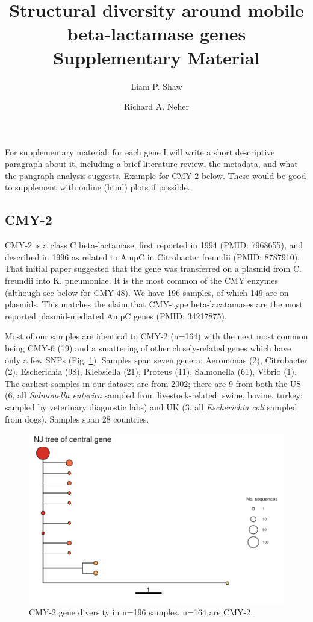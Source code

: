 \documentclass[aps,rmp,preprint,superscriptaddress,10pt,twocolumn]{revtex4-1}
\begin{document}
\title{Structural diversity around mobile beta-lactamase genes\\Supplementary Material}
\author{Liam P. Shaw}
\author{Richard A. Neher}

\maketitle

\noindent For supplementary material: for each gene I will write a short descriptive paragraph about it, including a brief literature review, the metadata, and what the pangraph analysis suggests. Example for CMY-2 below. These would be good to supplement with online (html) plots if possible.  

\subsection{CMY-2}

CMY-2 is a class C beta-lactamase, first reported in 1994 (PMID: 7968655), and described in 1996 as related to AmpC in Citrobacter freundii (PMID: 8787910). That initial paper suggested that the gene was transferred on a plasmid from C. freundii into K. pneumoniae. It is the most common of the CMY enzymes (although see below for CMY-48). We have 196 samples, of which 149 are on plasmids. This matches the claim that CMY-type beta-lacatamases are the most reported plasmid-mediated AmpC genes (PMID: 34217875). 

Most of our samples are identical to CMY-2 (n=164) with the next most common being CMY-6 (19) and a smattering of other closely-related genes which have only a few SNPs (Fig. \ref{fig:CMY-2-NJ-gene-tree}). Samples span seven genera: Aeromonas (2), Citrobacter (2), Escherichia (98), Klebsiella (21), Proteus (11), Salmonella (61), Vibrio (1). The earliest samples in our dataset are from 2002; there are 9 from both the US (6, all \textit{Salmonella enterica} sampled from livestock-related: swine, bovine, turkey; sampled by veterinary diagnostic labs) and UK (3, all \textit{Escherichia coli} sampled from dogs). Samples span 28 countries. 
 

\begin{figure}
    \centering
    \includegraphics[width=0.5\linewidth]{figs/CMY-2-mmseqs2-polish.all_u5000_d5000_focal_gene.dedup.txt-NJ-gene-tree.pdf}
    \caption{CMY-2 gene diversity in n=196 samples. n=164 are CMY-2.}
    \label{fig:CMY-2-NJ-gene-tree}
\end{figure}
\end{document}
